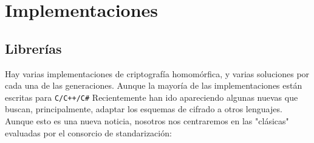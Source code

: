 \chapter{Implementaciones}
\label{chap:libs}

\section{Librerías}

Hay varias implementaciones de criptografía homomórfica, y varias soluciones por cada una de las generaciones. Aunque la mayoría de las implementaciones están escritas para \verb|C/C++/C#| Recientemente han ido apareciendo algunas nuevas que buscan, principalmente, adaptar los esquemas de cifrado a otros lenguajes. Aunque esto es una nueva noticia, nosotros nos centraremos en las "clásicas" evaluadas por el consorcio de standarización:


